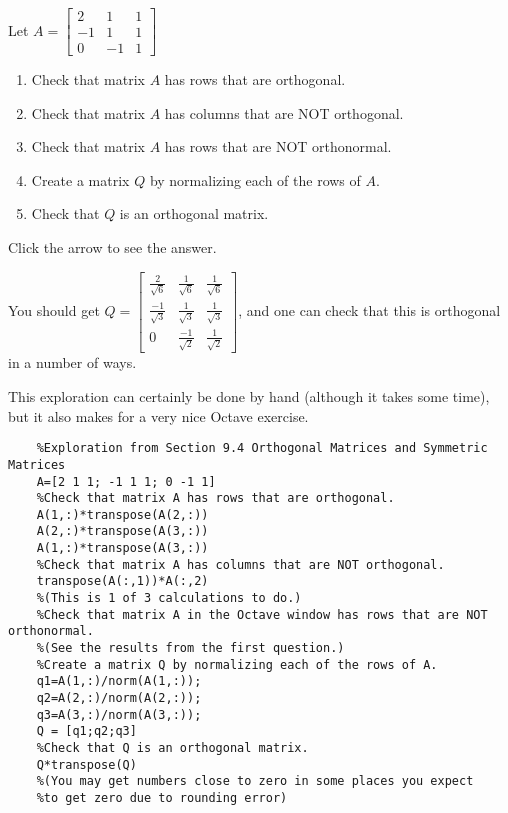 \documentclass{ximera}
\begin{document}

\begin{exploration}\label{exp:make_orthogonal}
Let $A=\begin{bmatrix}
    2&1&1\\-1&1&1\\0&-1&1
\end{bmatrix}$
\begin{enumerate}
    \item Check that matrix $A$ has rows that are orthogonal.
    \item Check that matrix $A$ has columns that are NOT orthogonal.
    \item Check that matrix $A$ has rows that are NOT orthonormal.
    \item Create a matrix $Q$ by normalizing each of the rows of $A$.
    \item Check that $Q$ is an orthogonal matrix.
\end{enumerate}

Click the arrow to see the answer.
\begin{expandable}
You should get $Q = \begin{bmatrix}
\frac{2}{\sqrt{6}} & \frac{1}{\sqrt{6}} & \frac{1}{\sqrt{6}} \\
\frac{-1}{\sqrt{3}} & \frac{1}{\sqrt{3}} & \frac{1}{\sqrt{3}} \\
0 & \frac{-1}{\sqrt{2}} & \frac{1}{\sqrt{2}}
\end{bmatrix}$, and one can check that this is orthogonal in a number of ways.
\end{expandable}

This exploration can certainly be done by hand (although it takes some time), but it also makes for a very nice Octave exercise.

\begin{verbatim}
    %Exploration from Section 9.4 Orthogonal Matrices and Symmetric Matrices
    A=[2 1 1; -1 1 1; 0 -1 1]
    %Check that matrix A has rows that are orthogonal.
    A(1,:)*transpose(A(2,:)) 
    A(2,:)*transpose(A(3,:)) 
    A(1,:)*transpose(A(3,:)) 
    %Check that matrix A has columns that are NOT orthogonal.
    transpose(A(:,1))*A(:,2) 
    %(This is 1 of 3 calculations to do.)
    %Check that matrix A in the Octave window has rows that are NOT orthonormal.
    %(See the results from the first question.)
    %Create a matrix Q by normalizing each of the rows of A.
    q1=A(1,:)/norm(A(1,:)); 
    q2=A(2,:)/norm(A(2,:));
    q3=A(3,:)/norm(A(3,:));
    Q = [q1;q2;q3]
    %Check that Q is an orthogonal matrix.
    Q*transpose(Q)
    %(You may get numbers close to zero in some places you expect 
    %to get zero due to rounding error)
\end{verbatim}


\end{exploration}
\end{document}
